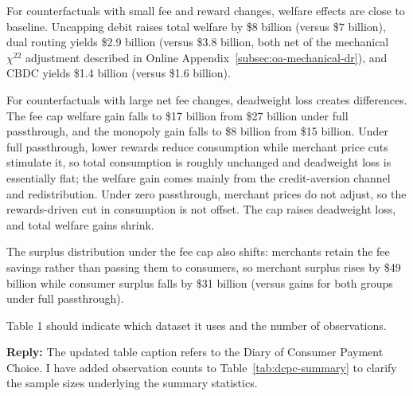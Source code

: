\documentclass[main.tex]{subfiles}
\begin{document}
\begin{refsection}
For counterfactuals with small fee and reward changes, welfare effects are close to baseline.
Uncapping debit raises total welfare by \$8 billion (versus \$7 billion), dual routing yields \$2.9 billion (versus \$3.8 billion, both net of the mechanical $\chi^{22}$ adjustment described in Online Appendix~\ref{subsec:oa-mechanical-dr}), and CBDC yields \$1.4 billion (versus \$1.6 billion).

For counterfactuals with large net fee changes, deadweight loss creates differences.
The fee cap welfare gain falls to \$17 billion from \$27 billion under full passthrough, and the monopoly gain falls to \$8 billion from \$15 billion.
Under full passthrough, lower rewards reduce consumption while merchant price cuts stimulate it, so total consumption is roughly unchanged and deadweight loss is essentially flat; the welfare gain comes mainly from the credit-aversion channel and redistribution.
Under zero passthrough, merchant prices do not adjust, so the rewards-driven cut in consumption is not offset.
The cap raises deadweight loss, and total welfare gains shrink.

The surplus distribution under the fee cap also shifts: merchants retain the fee savings rather than passing them to consumers, so merchant surplus rises by \$49 billion while consumer surplus falls by \$31 billion (versus gains for both groups under full passthrough).

\begin{refcommentnoclear}
Table 1 should indicate which dataset it uses and the number of observations.

\end{refcommentnoclear}

\textbf{Reply:} The updated table caption refers to the Diary of Consumer Payment Choice. I have added observation counts to Table~\ref{tab:dcpc-summary} to clarify the sample sizes underlying the summary statistics.


\end{refsection}
\end{document}
